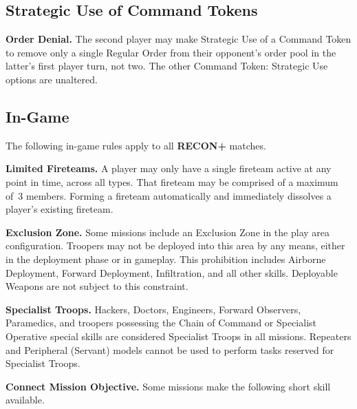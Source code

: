 \documentclass[14pt,dvipsnames]{extarticle}
\newcommand{\missionrule}[1]{\noindent\textbf{#1}\xspace}
\newenvironment{squishitemize}
{\begin{list}{$\bullet$}{%
    \setlength{\itemsep}{2pt}%
    \setlength{\parsep}{2pt}%
    \setlength{\topsep}{2pt}%
    \setlength{\parskip}{0pt} %
    \renewcommand{\labelitemi}{--}}}
  {\end{list}}
\newcommand{\reconplus}{\textbf{RECON+}\xspace}
\begin{document}

\subsection{Strategic Use of Command Tokens}

\missionrule{Order Denial.} The second player may make Strategic Use
of a Command Token to remove only a single Regular Order from their
opponent's order pool in the latter's first player turn, not two.  The
other Command Token: Strategic Use options are unaltered.

\subsection{In-Game}

The following in-game rules apply to all \reconplus matches.

\missionrule{Limited Fireteams.}  A player may only have a single
fireteam active at any point in time, across all types.  That fireteam
may be comprised of a maximum of~3 members.  Forming a fireteam
automatically and immediately dissolves a player's existing fireteam.

\missionrule{Exclusion Zone.}  Some missions include an Exclusion Zone
in the play area configuration.  Troopers may not be deployed into
this area by any means, either in the deployment phase or in gameplay.
This prohibition includes Airborne Deployment, Forward Deployment,
Infiltration, and all other skills.  Deployable Weapons are not
subject to this constraint.

\missionrule{Specialist Troops.}  Hackers, Doctors, Engineers,
Forward Observers, Paramedics, and troopers possessing the Chain of
Command or Specialist Operative special skills are considered
Specialist Troops in all missions.  Repeaters and Peripheral (Servant)
models cannot be used to perform tasks reserved for Specialist Troops.

\pagebreak
\missionrule{Connect Mission Objective.} Some missions make the
following short skill available.
\label{sec:hack-objective}
\end{document}
